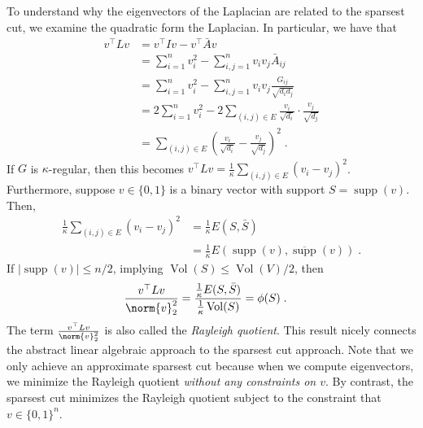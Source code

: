 \begin{remark}
To understand why the eigenvectors of the Laplacian are related to the sparsest cut, we examine the quadratic form the Laplacian. In particular, we have that
\begin{align}
    v^\top L v &= v^\top I v - v^\top \bar{A} v \\
    &= \sum_{i=1}^n v_i^2 - \sum_{i, j = 1}^n v_i v_j \bar{A}_{ij} \\
    &= \sum_{i=1}^n v_i^2 - \sum_{i, j = 1}^n v_i v_j \frac{G_{ij}}{\sqrt{d_i d_j}} \\
    &= 2\sum_{i=1}^n v_i^2 - 2 \sum_{(i, j) \in E} \frac{v_i}{\sqrt{d_i}} \cdot \frac{v_j}{\sqrt{d_j}} \\
    &= \sum_{(i, j) \in E} \left( \frac{v_i}{\sqrt{d_i}} - \frac{v_j}{\sqrt{d_j}} \right)^2 \;.
\end{align}
If $G$ is $\kappa$-regular, then this becomes $v^\top L v = \frac{1}{\kappa} \sum_{(i, j) \in E} (v_i - v_j)^2$. Furthermore, suppose $v \in \{0, 1\}$ is a binary vector with support $S = \operatorname{supp}(v)$. Then, 
\begin{align}
    \frac{1}{\kappa} \sum_{(i, j) \in E} (v_i - v_j)^2 &= \frac{1}{\kappa} E(S, \bar{S}) \\
    &= \frac{1}{\kappa} E(\operatorname{supp}(v), \overline{\operatorname{supp}}(v)) \;.
\end{align}
If $|\operatorname{supp}(v)| \leq n/2$, implying $\operatorname{Vol}(S) \leq \operatorname{Vol}(V)/2$, then
\begin{align}
    \frac{v^\top L v}{\norm{v}^2_2} &= \frac{\frac{1}{\kappa} E(S, \bar{S})}{\frac{1}{\kappa} \operatorname{Vol}(S)} = \phi(S) \;.
\end{align}
The term $\frac{v^\top L v}{\norm{v}^2_2}$ is also called the {\it Rayleigh quotient}. This result nicely connects the abstract linear algebraic approach to the sparsest cut approach. Note that we only achieve an approximate sparsest cut because when we compute eigenvectors, we minimize the Rayleigh quotient \emph{without any constraints on $v$}. By contrast, the sparsest cut minimizes the Rayleigh quotient subject to the constraint that $v \in \{0,1\}^n$.
\end{remark}



